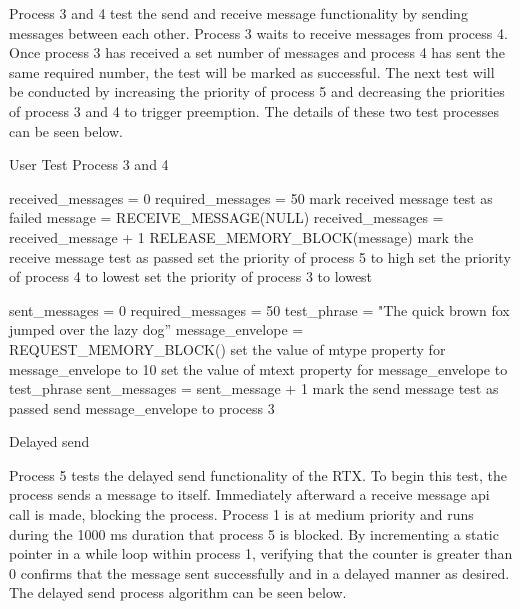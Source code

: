 \documentclass[12pt]{report}
\begin{document}
\noindent Process 3 and 4 test the send and receive message functionality by sending messages between each other. Process 3 waits to receive messages from process 4. Once process 3 has received a set number of messages and process 4 has sent the same required number, the test will be marked as successful. The next test will be conducted by increasing the priority of process 5 and decreasing the priorities of process 3 and 4 to trigger preemption. The details of these two test processes can be seen below.
\begin{algorithm}
  \caption{User Test Process 3 and 4}
  \begin{algorithmic}[1]
      \State received\_messages = 0
      \State required\_messages = 50
        \State mark received message test as failed
        \State message = RECEIVE\_MESSAGE(NULL)
        \State received\_messages = received\_message + 1
        \State RELEASE\_MEMORY\_BLOCK(message)
          \State mark the receive message test as passed
              \State set the priority of process 5 to high
              \State set the priority of process 4 to lowest
              \State set the priority of process 3 to lowest
        \EndIf
      \EndWhile
    \EndFunction

      \State sent\_messages = 0
      \State required\_messages = 50
      \State test\_phrase = "The quick brown fox jumped over the lazy dog”
        \State message\_envelope = REQUEST\_MEMORY\_BLOCK()
        \State set the value of mtype property for message\_envelope to 10
        \State set the value of mtext property for message\_envelope to test\_phrase
        \State sent\_messages = sent\_message + 1
          \State mark the send message test as passed
        \Else
          \State send message\_envelope to process 3
        \EndIf
      \EndWhile
    \EndFunction
  \end{algorithmic}
\end{algorithm}

 Delayed send

\noindent Process 5 tests the delayed send functionality of the RTX. To begin this test, the process sends a message to itself. Immediately afterward a receive message api call is made, blocking the process. Process 1 is at medium priority and runs during the 1000 ms duration that process 5 is blocked. By incrementing a static pointer in a while loop within process 1, verifying that the counter is greater than 0 confirms that the message sent successfully and in a delayed manner as desired.  The delayed send process algorithm can be seen below.
\end{document}
